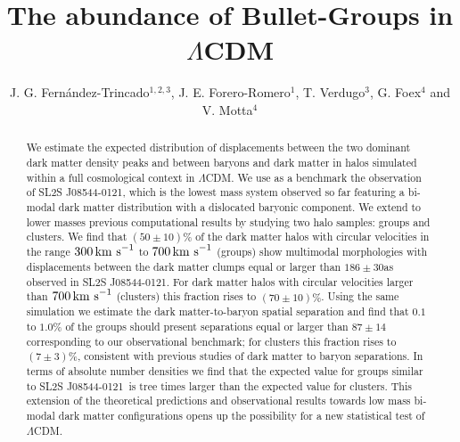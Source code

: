 \documentclass{emulateapj}
\newcommand{\hkpc}{{\ifmmode{h^{-1}{\rm kpc}}\else{$h^{-1}$kpc }\fi}}
\newcommand{\kms}{{\ifmmode{{\mathrm{\,km\ s}^{-1}}}\else{\,km~s$^{-1}$}\fi}}
\newcommand{\bullg}{SL2S J08544-0121}
\begin{document}
 

\title{The abundance of Bullet-Groups in $\Lambda$CDM}
\author{J. G. Fern\'andez-Trincado$^{1,2,3}$, J. E. Forero-Romero$^1$,
  T. Verdugo$^3$, G. Foex$^4$ and V. Motta$^4$} 
\begin{abstract}

We estimate the expected distribution of displacements between the two
dominant dark matter density peaks and between baryons and dark matter
in halos simulated within a full cosmological context in $\Lambda$CDM.
We use as a benchmark the observation of \bullg, which is the lowest mass system observed so far
featuring a bi-modal dark matter distribution with a dislocated
baryonic component. We extend to lower masses previous computational results by
studying two halo samples: groups and clusters. We find that $(50 \pm
10)\%$ of the dark matter halos with circular velocities in the range
$300\kms$ to $700\kms$ (groups) show multimodal morphologies with
displacements between the dark matter clumps equal or larger than
$186 \pm 30$\hkpc as observed in \bullg. For dark matter halos with
circular velocities larger than $700\kms$ (clusters) this fraction
rises to $(70 \pm 10)\%$. Using the same simulation we estimate the
dark matter-to-baryon spatial separation and find that $0.1$ to
$1.0\%$ of the groups should present separations equal or
larger than $87\pm 14$\hkpc corresponding to our observational
benchmark; for clusters this fraction rises to $(7\pm 3)\%$, consistent
with previous studies of dark matter to baryon separations. In terms
of absolute number densities we find that the expected value for
groups similar to \bullg\ is tree times larger than the expected value
for clusters. This extension of the theoretical predictions and
observational results towards low mass bi-modal dark matter
configurations opens up the possibility for a new statistical test of
$\Lambda$CDM.   
\end{abstract}
\end{document}
